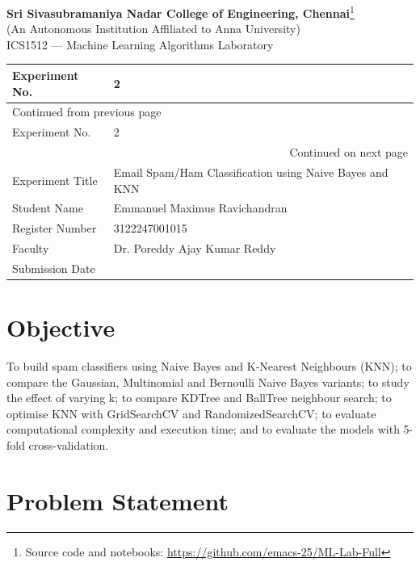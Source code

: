 \documentclass[11pt]{article}
\author{root}
\date{\today}
\title{}
\begin{document}
\begin{center}{\Large\bfseries Sri Sivasubramaniya Nadar College of Engineering, Chennai}\footnote{Source code and notebooks: \url{https://github.com/emacs-25/ML-Lab-Full}}\\[2pt]
(An Autonomous Institution Affiliated to Anna University)\\[2pt]
{\large ICS1512 --- Machine Learning Algorithms Laboratory}\end{center}

\begin{longtable}{|p{4cm}|p{11cm}|}
\hline
Experiment No. & 2\\[0pt]
\hline
\endfirsthead
\multicolumn{2}{l}{Continued from previous page} \\[0pt]
\hline

Experiment No. & 2 \\[0pt]

\hline
\endhead
\hline\multicolumn{2}{r}{Continued on next page} \\
\endfoot
\endlastfoot
\hline
Experiment Title & Email Spam/Ham Classification using Naive Bayes and KNN\\[0pt]
\hline
Student Name & Emmanuel Maximus Ravichandran\\[0pt]
\hline
Register Number & 3122247001015\\[0pt]
\hline
Faculty & Dr. Poreddy Ajay Kumar Reddy\\[0pt]
\hline
Submission Date & \\[0pt]
\hline
\end{longtable}

\section*{Objective}
\label{sec:org480879d}


To build spam classifiers using Naive Bayes and K-Nearest Neighbours (KNN); to compare the
Gaussian, Multinomial and Bernoulli Naive Bayes variants; to study the effect of varying k;
to compare KDTree and BallTree neighbour search; to optimise KNN with GridSearchCV and
RandomizedSearchCV; to evaluate computational complexity and execution time; and to evaluate
the models with 5-fold cross-validation.

\section*{Problem Statement}
\label{sec:org66c7a64}
\end{document}
